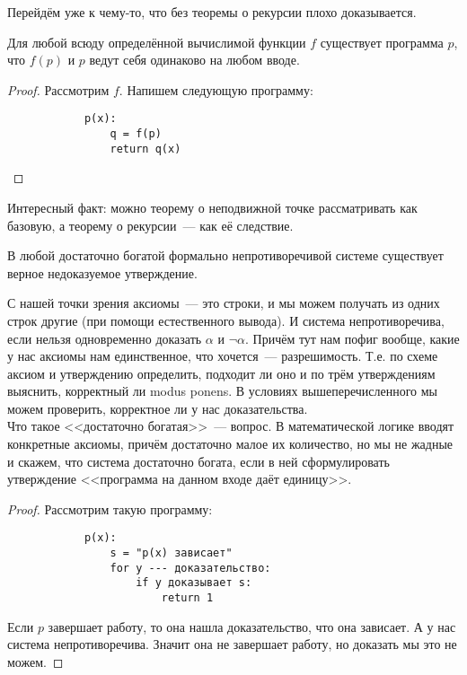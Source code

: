 \documentclass{article}
\begin{document}
    \begin{remark}
        Перейдём уже к чему-то, что без теоремы о рекурсии плохо доказывается.
    \end{remark}
    \begin{theorem}
        Для любой всюду определённой вычислимой функции $f$ существует программа $p$, что $f(p)$ и $p$ ведут себя одинаково на любом вводе.
    \end{theorem}
    \begin{proof}
        Рассмотрим $f$. Напишем следующую программу:
        \begin{verbatim}
            p(x):
                q = f(p)
                return q(x)
        \end{verbatim}
    \end{proof}
    \begin{remark}
        Интересный факт: можно теорему о неподвижной точке рассматривать как базовую, а теорему о рекурсии~--- как её следствие.
    \end{remark}
    \begin{theorem}
        В любой достаточно богатой формально непротиворечивой системе существует верное недоказуемое утверждение.
    \end{theorem}
    \begin{remark}
        С нашей точки зрения аксиомы~--- это строки, и мы можем получать из одних строк другие (при помощи естественного вывода). И система непротиворечива, если нельзя одновременно доказать $\alpha$ и $\neg\alpha$. Причём тут нам пофиг вообще, какие у нас аксиомы нам единственное, что хочется~--- разрешимость. Т.е. по схеме аксиом и утверждению определить, подходит ли оно и по трём утверждениям выяснить, корректный ли modus ponens. В условиях вышеперечисленного мы можем проверить, корректное ли у нас доказательства.\\
        Что такое <<достаточно богатая>>~--- вопрос. В математической логике вводят конкретные аксиомы, причём достаточно малое их количество, но мы не жадные и скажем, что система достаточно богата, если в ней сформулировать утверждение <<программа на данном входе даёт единицу>>.
    \end{remark}
    \begin{proof}
        Рассмотрим такую программу:
        \begin{verbatim}
            p(x):
                s = "p(x) зависает"
                for y --- доказательство:
                    if y доказывает s:
                        return 1
        \end{verbatim}
        Если $p$ завершает работу, то она нашла доказательство, что она зависает. А у нас система непротиворечива. Значит она не завершает работу, но доказать мы это не можем.
    \end{proof}
\end{document}
